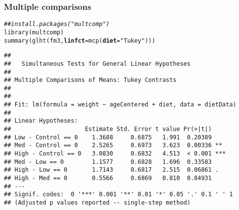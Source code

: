 \documentclass[color=usenames,dvipsnames]{beamer}\usepackage[]{graphicx}\usepackage[]{color}
\makeatletter
\newcommand{\hlstr}[1]{\textcolor[rgb]{0.749,0.012,0.012}{#1}}%
\newcommand{\hlcom}[1]{\textcolor[rgb]{0.514,0.506,0.514}{\textit{#1}}}%
\newcommand{\hlstd}[1]{\textcolor[rgb]{0,0,0}{#1}}%
\newcommand{\hlkwc}[1]{\textcolor[rgb]{0,0,0}{\textbf{#1}}}%
\newcommand{\hlkwd}[1]{\textcolor[rgb]{0.004,0.004,0.506}{#1}}%
\newenvironment{kframe}{%
 \def\at@end@of@kframe{}%
 \ifinner\ifhmode%
  \def\at@end@of@kframe{\end{minipage}}%
  \begin{minipage}{\columnwidth}%
 \fi\fi%
 \def\FrameCommand##1{\hskip\@totalleftmargin \hskip-\fboxsep
 \colorbox{shadecolor}{##1}\hskip-\fboxsep
     \hskip-\linewidth \hskip-\@totalleftmargin \hskip\columnwidth}%
 \MakeFramed {\advance\hsize-\width
   \@totalleftmargin\z@ \linewidth\hsize
   \@setminipage}}%
 {\par\unskip\endMakeFramed%
 \at@end@of@kframe}
\newenvironment{knitrout}{}{} %
\makeatother
\begin{document}
\begin{frame}[fragile]
  \frametitle{Multiple comparisons}
\scriptsize
\begin{knitrout}
\color{fgcolor}\begin{kframe}
\begin{alltt}
\hlcom{## install.packages("multcomp")}
\hlkwd{library}\hlstd{(multcomp)}
\hlkwd{summary}\hlstd{(}\hlkwd{glht}\hlstd{(fm3,} \hlkwc{linfct}\hlstd{=}\hlkwd{mcp}\hlstd{(}\hlkwc{diet}\hlstd{=}\hlstr{"Tukey"}\hlstd{)))}
\end{alltt}
\begin{verbatim}
## 
## 	 Simultaneous Tests for General Linear Hypotheses
## 
## Multiple Comparisons of Means: Tukey Contrasts
## 
## 
## Fit: lm(formula = weight ~ ageCentered + diet, data = dietData)
## 
## Linear Hypotheses:
##                     Estimate Std. Error t value Pr(>|t|)    
## Low - Control == 0    1.3688     0.6875   1.991  0.20389    
## Med - Control == 0    2.5265     0.6973   3.623  0.00336 ** 
## High - Control == 0   3.0830     0.6832   4.513  < 0.001 ***
## Med - Low == 0        1.1577     0.6828   1.696  0.33583    
## High - Low == 0       1.7143     0.6817   2.515  0.06861 .  
## High - Med == 0       0.5566     0.6869   0.810  0.84931    
## ---
## Signif. codes:  0 '***' 0.001 '**' 0.01 '*' 0.05 '.' 0.1 ' ' 1
## (Adjusted p values reported -- single-step method)
\end{verbatim}
\end{kframe}
\end{knitrout}
\end{frame}
\end{document}

